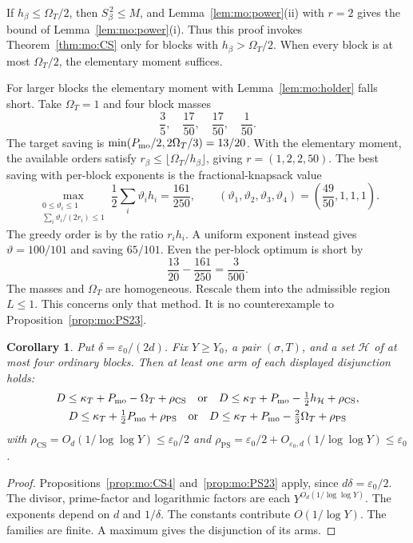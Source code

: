 \documentclass{amsart}
\newtheorem{corollary}[lemma]{Corollary}
\theoremstyle{definition}
\theoremstyle{plain}
\numberwithin{equation}{section}
\numberwithin{table}{section}
\begin{document}
If $h_\beta\le \Omega_T/2$, then $S_\beta^{\,2}\le M$, and
Lemma~\ref{lem:mo:power}(ii) with $r=2$ gives the bound of
Lemma~\ref{lem:mo:power}(i). Thus this proof invokes
Theorem~\ref{thm:mo:CS} only for blocks with $h_\beta>\Omega_T/2$. When every
block is at most $\Omega_T/2$, the elementary moment suffices.

For larger blocks the elementary moment with Lemma~\ref{lem:mo:holder}
falls short. Take $\Omega_T=1$ and four block masses
\[
 \frac35,\quad \frac{17}{50},\quad \frac{17}{50},\quad \frac1{50}.
\]
The target saving is $\min(P_{\rm mo}/2,2\Omega_T/3)=13/20$. With the
elementary moment, the available orders satisfy
$r_\beta\le\lfloor\Omega_T/h_\beta\rfloor$, giving
$r=(1,2,2,50)$. The best saving with
per-block exponents is the fractional-knapsack value
\[
 \max_{\substack{0\le\vartheta_i\le1\\\sum_i\vartheta_i/(2r_i)\le1}}
 \frac12\sum_i\vartheta_i h_i=\frac{161}{250},
 \qquad (\vartheta_1,\vartheta_2,\vartheta_3,\vartheta_4)
 =\left(\frac{49}{50},1,1,1\right).
\]
The greedy order is by the ratio $r_i h_i$. A uniform exponent instead gives
$\vartheta=100/101$ and saving $65/101$. Even the per-block optimum is short by
\[
 \frac{13}{20}-\frac{161}{250}=\frac3{500}.
\]
The masses and $\Omega_T$ are homogeneous. Rescale them into the admissible
region $L\le1$. This concerns only that method. It is no counterexample to
Proposition~\ref{prop:mo:PS23}.

\begin{corollary}\label{cor:mo:rows}
Put $\delta=\varepsilon_0/(2d)$.
Fix $Y\ge Y_0$, a pair $(\sigma,T)$, and a set $\mathcal H$ of at most four
ordinary blocks. Then at least one arm of each displayed disjunction holds:
\begin{gather}
 D\le \kappa_T+P_{\rm mo}-\Omega_T+\rho_{\mathrm{CS}}\quad\text{or}\quad
 D\le \kappa_T+P_{\rm mo}-\tfrac12h_{\mathcal H}+\rho_{\mathrm{CS}},\label{eq:mo:CS4or}\\
 D\le \kappa_T+\tfrac12P_{\rm mo}+\rho_{\mathrm{PS}}\quad\text{or}\quad
 D\le \kappa_T+P_{\rm mo}-\tfrac23\Omega_T+\rho_{\mathrm{PS}}\label{eq:mo:PS23or}
\end{gather}
with $\rho_{\mathrm{CS}}=O_d(1/\log\log Y)\le\varepsilon_0/2$ and
$\rho_{\mathrm{PS}}=\varepsilon_0/2+O_{\varepsilon_0,d}(1/\log\log Y)\le\varepsilon_0$.
\end{corollary}

\begin{proof}
Propositions~\ref{prop:mo:CS4} and~\ref{prop:mo:PS23} apply, since
$d\delta=\varepsilon_0/2$. The divisor, prime-factor and logarithmic factors
are each $Y^{O_d(1/\log\log Y)}$. The exponents depend on $d$ and $1/\delta$.
The constants contribute $O(1/\log Y)$. The families are finite. A maximum
gives the disjunction of its arms.
\end{proof}
\end{document}

